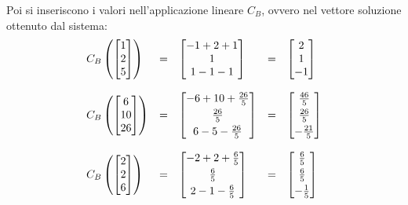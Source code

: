 \documentclass[a4paper]{article}
\makeatletter
\newenvironment{rowequmatbra}[1]{\left[\array{@{}#1@{}}}{\endarray\right]}
\makeatother
\begin{document}
	\noindent
	Poi si inseriscono i valori nell'applicazione lineare $C_{B}$, ovvero nel vettore soluzione ottenuto dal sistema:
	\begin{equation*}
		\begin{array}{lllll}
			C_{B}\left(\begin{bmatrix}
				1 \\
				2 \\
				5
			\end{bmatrix}\right) & = & \begin{bmatrix}
				-1 +2 +1 \\
				1 \\
				1 -1 -1
			\end{bmatrix} & = & \begin{bmatrix}
				2 \\
				1 \\
				-1
			\end{bmatrix} \\
			\\
			C_{B}\left(\begin{bmatrix}
				6 \\
				10 \\
				26
			\end{bmatrix}\right) & = & \begin{rowequmatbra}{c}
				-6 +10 +\frac{26}{5} \\ [0.3em]
				\frac{26}{5} \\ [0.3em]
				6 -5 -\frac{26}{5}
			\end{rowequmatbra} & = & \begin{rowequmatbra}{c}
				\frac{46}{5} \\ [0.3em]
				\frac{26}{5} \\ [0.3em]
				-\frac{21}{5}
			\end{rowequmatbra} \\
			\\
			C_{B}\left(\begin{bmatrix}
				2 \\
				2 \\
				6
			\end{bmatrix}\right) & = & \begin{rowequmatbra}{c}
				-2 +2 +\frac{6}{5} \\ [0.3em]
				\frac{6}{5} \\ [0.3em]
				2 -1 -\frac{6}{5}
			\end{rowequmatbra} & = & \begin{rowequmatbra}{c}
				\frac{6}{5} \\ [0.3em]
				\frac{6}{5} \\ [0.3em]
				-\frac{1}{5}
			\end{rowequmatbra}
		\end{array}
	\end{equation*}
\end{document}
